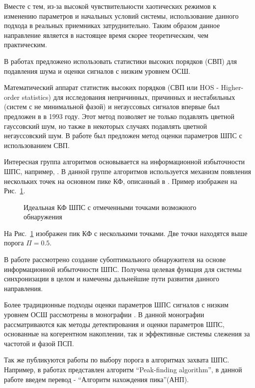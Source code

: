 Вместе с тем, из-за высокой чувствительности хаотических режимов к изменению параметров и начальных условий системы, использование данного подхода
в реальных приемниках затруднительно. Таким образом данное направление является в настоящее время скорее теоретическим, чем практическим.

В работах \cite{hos_petropulu, hos_zhao} предложено использовать статистики высоких порядков (СВП) для подавления шума и оценки
сигналов с низким уровнем ОСШ.

Математический аппарат статистик высоких порядков (СВП или HOS - Higher-order statistics)
для исследования непричинных, причинных и нестабильных
(систем с не минимальной фазой) и негауссовых сигналов впервые был предложен в \cite{hos_petropulu} в 1993 году.
Этот метод позволяет не только подавлять цветной гауссовский шум, но также в некоторых случаях подавлять
цветной негауссовский шум. В работе \cite{hos_zhao} был предложен метод оценки параметров ШПС с использованием СВП.

Интересная группа алгоритмов основывается на информационной избыточности ШПС, например, \cite{phd_che}. В данной
группе алгоритмов используется механизм появления нескольких точек на основном пике КФ, описанный в \cite{kaplan}. Пример
изображен на \mbox{Рис. \ref{pic:sec1_peak_tcd}}.
\begin{figure}[h]
	\center{}
	\caption{Идеальная КФ ШПС с отмеченными точками возможного обнаружения}
	\label{pic:sec1_peak_tcd}
\end{figure}

На \mbox{Рис. \ref{pic:sec1_peak_tcd}} изображен пик КФ с несколькими точками. Две точки находятся выше порога ${\Pi=0.5}$.

В работе \cite{phd_che} рассмотрено создание субоптимального обнаружителя на основе информационной избыточности ШПС.
Получена целевая функция для системы синхронизации в целом и намечены дальнейшие пути развития данного направления.

Более традиционные подходы оценки параметров ШПС сигналов с низким уровнем ОСШ рассмотрены в монографии \cite{ziedan-book}.
В данной монографии рассматриваются как методы детектирования и оценки параметров ШПС, основанные на когерентном накоплении, так и эффективные
системы слежения за частотой и фазой ПСП.

Так же публикуются работы по выбору порога в алгоритмах захвата ШПС. Например, в работах \cite{2max_ieee, 2max_article} представлен алгоритм
\textquotedblleft{Peak-finding algorithm}\textquotedblright,
в данной работе введем перевод -
\textquotedblleft{Алгоритм нахождения пика}\textquotedblright (АНП). 

